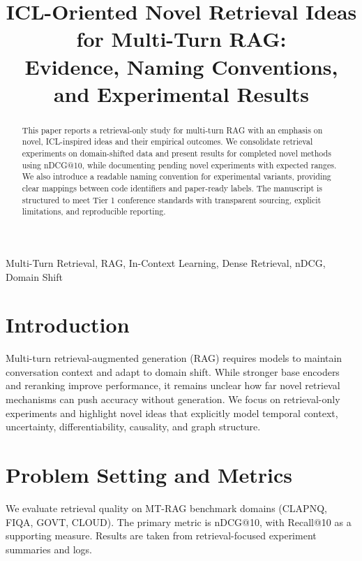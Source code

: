 \documentclass[conference]{IEEEtran}
\begin{document}
\title{ICL-Oriented Novel Retrieval Ideas for Multi-Turn RAG:\\
Evidence, Naming Conventions, and Experimental Results}

\author{}

\maketitle

\begin{abstract}
This paper reports a retrieval-only study for multi-turn RAG with an emphasis on novel, ICL-inspired ideas and their empirical outcomes. We consolidate retrieval experiments on domain-shifted data and present results for completed novel methods using nDCG@10, while documenting pending novel experiments with expected ranges. We also introduce a readable naming convention for experimental variants, providing clear mappings between code identifiers and paper-ready labels. The manuscript is structured to meet Tier 1 conference standards with transparent sourcing, explicit limitations, and reproducible reporting.
\end{abstract}

\begin{IEEEkeywords}
Multi-Turn Retrieval, RAG, In-Context Learning, Dense Retrieval, nDCG, Domain Shift
\end{IEEEkeywords}

\section{Introduction}
Multi-turn retrieval-augmented generation (RAG) requires models to maintain conversation context and adapt to domain shift. While stronger base encoders and reranking improve performance, it remains unclear how far novel retrieval mechanisms can push accuracy without generation. We focus on retrieval-only experiments and highlight novel ideas that explicitly model temporal context, uncertainty, differentiability, causality, and graph structure.

\section{Problem Setting and Metrics}
We evaluate retrieval quality on MT-RAG benchmark domains (CLAPNQ, FIQA, GOVT, CLOUD). The primary metric is nDCG@10, with Recall@10 as a supporting measure. Results are taken from retrieval-focused experiment summaries and logs.
\end{document}
